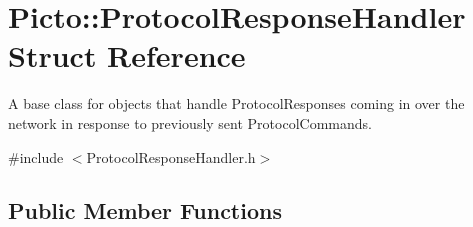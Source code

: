 \hypertarget{struct_picto_1_1_protocol_response_handler}{\section{Picto\-:\-:Protocol\-Response\-Handler Struct Reference}
\label{struct_picto_1_1_protocol_response_handler}
}


A base class for objects that handle Protocol\-Responses coming in over the network in response to previously sent Protocol\-Commands.  




{\ttfamily \#include $<$Protocol\-Response\-Handler.\-h$>$}

\subsection*{Public Member Functions}
